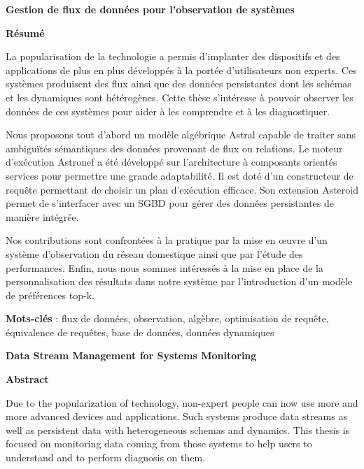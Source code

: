 \closed
\clearpage
\ifodd\value{page}\hbox{}\newpage\fi
  
\begin{center}\textbf{\large Gestion de flux de données pour l'observation de systèmes}

\quad

\textbf{Résumé}
\end{center}

La popularisation de la technologie a permis d'implanter des dispositifs et des applications de plus en plus développés à la portée d'utilisateurs non experts. Ces systèmes produisent des flux ainsi que des données persistantes dont les schémas et les dynamiques sont hétérogènes. Cette thèse s'intéresse à pouvoir observer les données de ces systèmes pour aider à les comprendre et à les diagnostiquer.

Nous proposons tout d'abord un modèle algébrique Astral capable de traiter sans ambiguïtés sémantiques des données provenant de flux ou relations. Le moteur d'exécution Astronef a été développé sur l'architecture à composants orientés services pour permettre une grande adaptabilité. Il est doté d'un constructeur de requête permettant de choisir un plan d'exécution efficace. Son extension Asteroid permet de s'interfacer avec un SGBD pour gérer des données persistantes de manière intégrée.

Nos contributions sont confrontées à la pratique par la mise en œuvre d'un système d'observation du réseau domestique ainsi que par l'étude des performances. Enfin, nous nous sommes intéressés à la mise en place de la personnalisation des résultats dans notre système par l'introduction d'un modèle de préférences top-k.

\quad

\textbf{Mots-clés} : flux de données, observation, algèbre, optimisation de requête, équivalence de requêtes, base de données, données dynamiques

\begin{center}\textbf{\large Data Stream Management for Systems Monitoring}

\quad

\textbf{Abstract}
\end{center}

Due to the popularization of technology, non-expert people can now use more and more advanced devices and applications. Such systems produce data streams as well as persistent data with heterogeneous schemas and dynamics. This thesis is focused on monitoring data coming from those systems to help users to understand and to perform diagnosis on them.

